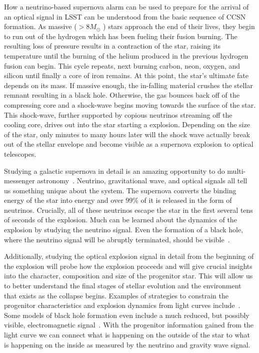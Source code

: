 \documentclass[11pt, letterpaper]{article}
\begin{document}
How a neutrino-based supernova alarm can be used to prepare for the
arrival of an optical signal in LSST can be understood from the basic
sequence of CCSN formation.  As massive ($ > 8 M_\odot$ ) stars
approach the end of their lives, they begin to run out of the hydrogen
which has been fueling their fusion burning.  The resulting loss of
pressure results in a contraction of the star, raising its temperature
until the burning of the helium produced in the previous hydrogen
fusion can begin. This cycle repeats, next burning carbon, neon,
oxygen, and silicon until finally a core of iron remains. At this
point, the star's ultimate fate depends on its mass.  If massive
enough, the in-falling material crushes the stellar remnant resulting
in a black hole.  Otherwise, the gas bounces back off of the
compressing core and a shock-wave begins moving towards the surface of
the star.  This shock-wave, further supported by copious neutrinos
streaming off the cooling core, drives out into the star starting a
explosion.  Depending on the size of the star, only minutes to many
hours later will the shock wave actually break out of the stellar
envelope and become visible as a supernova explosion to optical
telescopes.

Studying a galactic supernova in detail is an amazing opportunity to
do multi-messenger astronomy~\cite{2016MNRAS.461.3296N}.  Neutrino,
gravitational wave, and optical signals all tell us something unique
about the system.  The supernova converts the binding energy of the
star into energy and over 99\% of it is released in the form of
neutrinos.  Crucially, all of these neutrinos escape the star in the
first several tens of seconds of the explosion. Much can be learned
about the dynamics of the explosion by studying the neutrino signal.
Even the formation of a black hole, where the neutrino signal will be
abruptly terminated, should be visible~\cite{2011ApJ...730...70O,
  2017hsn..book.1555O}.

Additionally, studying the optical explosion signal in detail from the
beginning of the explosion will probe how the explosion proceeds and
will give crucial insights into the character, composition and size of
the progenitor star.  This will allow us to better understand the
final stages of stellar evolution and the environment that exists as
the collapse begins.  Examples of strategies to constrain the
progenitor characteristics and explosion dynamics from light curves
include~\cite{2010ApJ...725..904N, 2017NatPh..13..510Y,
  2018ApJ...856..146A}.  Some models of black hole formation even
include a much reduced, but possibly visible, electromagnetic
signal~\cite{2013ApJ...769..109L}. With the progenitor information
gained from the light curve we can connect what is happening on the
outside of the star to what is happening on the inside as measured by
the neutrino and gravity wave signal.
 
\end{document}
